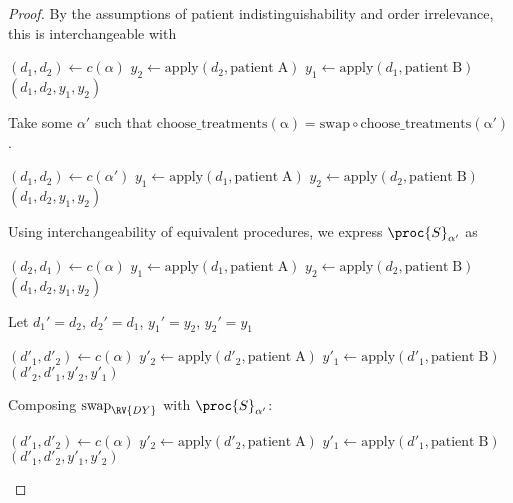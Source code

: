 \begin{proof}
By the assumptions of patient indistinguishability and order irrelevance, this is interchangeable with

\begin{algorithmic}
    \State $(d_1,d_2) \gets c(\alpha)$
    \State $y_2\gets \mathrm{apply}(d_2,\mathrm{patient\;A})$
    \State $y_1\gets \mathrm{apply}(d_1,\mathrm{patient\;B})$
    \State \Return $(d_1,d_2,y_1,y_2)$
    \EndProcedure
\end{algorithmic}

Take some $\alpha'$ such that $\mathrm{choose\_treatments(\alpha)} = \mathrm{swap}\circ \mathrm{choose\_treatments(\alpha')}$.

\begin{algorithmic}
    \State $(d_1,d_2) \gets c(\alpha')$
    \State $y_1\gets \mathrm{apply}(d_1,\mathrm{patient\;A})$
    \State $y_2\gets \mathrm{apply}(d_2,\mathrm{patient\;B})$
    \State \Return $(d_1,d_2,y_1,y_2)$
    \EndProcedure
\end{algorithmic}

Using interchangeability of equivalent procedures, we express $\proc{S}_{\alpha'}$ as

\begin{algorithmic}
    \State $(d_2,d_1) \gets c(\alpha)$
    \State $y_1\gets \mathrm{apply}(d_1,\mathrm{patient\;A})$
    \State $y_2\gets \mathrm{apply}(d_2,\mathrm{patient\;B})$
    \State \Return $(d_1,d_2,y_1,y_2)$
    \EndProcedure
\end{algorithmic}

Let $d_1'=d_2$, $d_2'=d_1$, $y_1'=y_2$, $y_2'=y_1$

\begin{algorithmic}
    \State $(d'_1,d'_2) \gets c(\alpha)$
    \State $y'_2\gets \mathrm{apply}(d'_2,\mathrm{patient\;A})$
    \State $y'_1\gets \mathrm{apply}(d'_1,\mathrm{patient\;B})$
    \State \Return $(d'_2,d'_1,y'_2,y'_1)$
    \EndProcedure
\end{algorithmic}

Composing $\text{swap}_{\RV{DY}}$ with $\proc{S}_{\alpha'}$:

\begin{algorithmic}
    \State $(d'_1,d'_2) \gets c(\alpha)$
    \State $y'_2\gets \mathrm{apply}(d'_2,\mathrm{patient\;A})$
    \State $y'_1\gets \mathrm{apply}(d'_1,\mathrm{patient\;B})$
    \State \Return $(d'_1,d'_2,y'_1,y'_2)$
    \EndProcedure
\end{algorithmic}


\end{proof}
